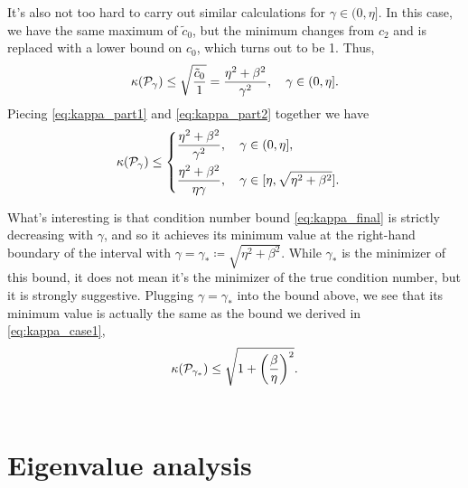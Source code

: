 \documentclass[a4paper,10pt]{article}
\begin{document}
It's also not too hard to carry out similar calculations for $\gamma \in (0,\eta]$. In this case, we have the same maximum of $\tilde{c}_0$, but the minimum changes from $c_2$ and is replaced with a lower bound on $c_0$, which turns out to be 1. Thus,
\begin{align}
\label{eq:kappa_part2}
\kappa({\cal P}_{\gamma}) \leq \sqrt{\frac{\tilde{c}_0}{1}} = \frac{\eta^2 + \beta^2}{\gamma^2}, \quad \gamma \in (0, \eta].
\end{align}
Piecing \eqref{eq:kappa_part1} and \eqref{eq:kappa_part2} together we have
\begin{align}
\label{eq:kappa_final}
\kappa({\cal P}_{\gamma}) \leq 
\begin{cases}
\displaystyle \frac{\eta^2 + \beta^2}{\gamma^2}, \quad \gamma \in (0, \eta], \\[2ex]
\displaystyle \frac{\eta^2 + \beta^2}{\eta \gamma}, \quad \gamma \in [\eta, \sqrt{\eta^2 + \beta^2}].
\end{cases}
\end{align}

What's interesting is that condition number bound \eqref{eq:kappa_final} is strictly decreasing with $\gamma$, and so it achieves its minimum value at the right-hand boundary of the interval with $\gamma = \gamma_* \coloneqq \sqrt{\eta^2 + \beta^2}$. While $\gamma_*$ is the minimizer of this bound, it does not mean it's the minimizer of the true condition number, but it is strongly suggestive. Plugging $\gamma = \gamma_*$ into the bound above, we see that its minimum value is actually the same as the bound we derived in \eqref{eq:kappa_case1},
\begin{align*} 
\kappa({\cal P}_{\gamma_*}) \leq \sqrt{1 + \left( \frac{\beta}{\eta} \right)^2}.
\end{align*}\\





\section{Eigenvalue analysis}
\end{document}
